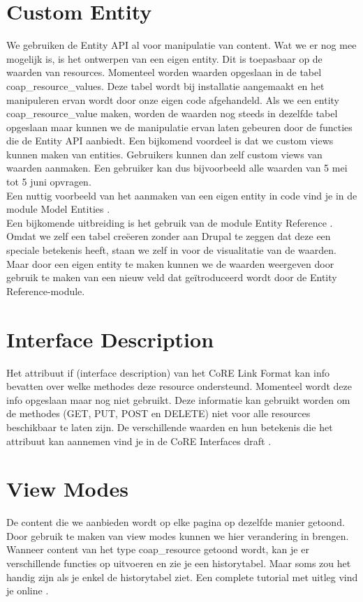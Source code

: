 \section{Custom Entity} \label{customEntity}
We gebruiken de Entity API al voor manipulatie van content. Wat we er nog mee mogelijk is, is het ontwerpen van een eigen entity. Dit is toepasbaar op de waarden van resources. Momenteel worden waarden opgeslaan in de tabel coap\_resource\_values. Deze tabel wordt bij installatie aangemaakt en het manipuleren ervan wordt door onze eigen code afgehandeld. Als we een entity coap\_resource\_value maken, worden de waarden nog steeds in dezelfde tabel opgeslaan maar kunnen we de manipulatie ervan laten gebeuren door de functies die de Entity API aanbiedt. Een bijkomend voordeel is dat we custom views kunnen maken van entities. Gebruikers kunnen dan zelf custom views van waarden aanmaken. Een gebruiker kan dus bijvoorbeeld alle waarden van 5 mei tot 5 juni opvragen.\\
Een nuttig voorbeeld van het aanmaken van een eigen entity in code vind je in de module Model Entities \cite{modelEntities}.\\

Een bijkomende uitbreiding is het gebruik van de module Entity Reference \cite{entityReference}. Omdat we zelf een tabel cre\"{e}eren zonder aan Drupal te zeggen dat deze een speciale betekenis heeft, staan we zelf in voor de visualitatie van de waarden. Maar door een eigen entity te maken kunnen we de waarden weergeven door gebruik te maken van een nieuw veld dat ge\"{i}troduceerd wordt door de Entity Reference-module.

\section{Interface Description}
Het attribuut if (interface description) van het CoRE Link Format kan info bevatten over welke methodes deze resource ondersteund. Momenteel wordt deze info opgeslaan maar nog niet gebruikt. Deze informatie kan gebruikt worden om de methodes (GET, PUT, POST en DELETE) niet voor alle resources beschikbaar te laten zijn. De verschillende waarden en hun betekenis die het attribuut kan aannemen vind je in de CoRE Interfaces draft \cite{coreInterfaces}.

\section{View Modes}
De content die we aanbieden wordt op elke pagina op dezelfde manier getoond. Door gebruik te maken van view modes kunnen we hier verandering in brengen. Wanneer content van het type coap\_resource getoond wordt, kan je er verschillende functies op uitvoeren en zie je een historytabel. Maar soms zou het handig zijn als je enkel de historytabel ziet. Een complete tutorial met uitleg vind je online \cite{viewMode}.

